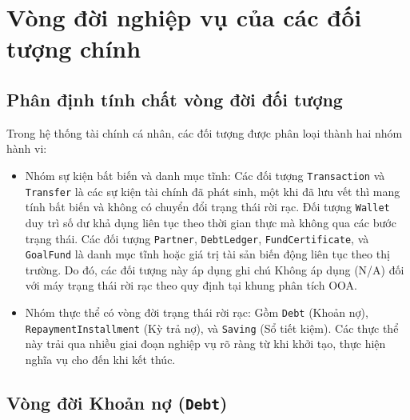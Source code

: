 \documentclass[11pt,a4paper]{article}
\newcommand{\code}[1]{\texttt{#1}}
\begin{document}
\section{Vòng đời nghiệp vụ của các đối tượng chính}

\subsection{Phân định tính chất vòng đời đối tượng}
Trong hệ thống tài chính cá nhân, các đối tượng được phân loại thành hai nhóm hành vi:
\begin{itemize}
  \item Nhóm sự kiện bất biến và danh mục tĩnh: Các đối tượng \code{Transaction} và \code{Transfer} là các sự kiện tài chính đã phát sinh, một khi đã lưu vết thì mang tính bất biến và không có chuyển đổi trạng thái rời rạc. Đối tượng \code{Wallet} duy trì số dư khả dụng liên tục theo thời gian thực mà không qua các bước trạng thái. Các đối tượng \code{Partner}, \code{DebtLedger}, \code{FundCertificate}, và \code{GoalFund} là danh mục tĩnh hoặc giá trị tài sản biến động liên tục theo thị trường. Do đó, các đối tượng này áp dụng ghi chú Không áp dụng (N/A) đối với máy trạng thái rời rạc theo quy định tại khung phân tích OOA.
  \item Nhóm thực thể có vòng đời trạng thái rời rạc: Gồm \code{Debt} (Khoản nợ), \code{RepaymentInstallment} (Kỳ trả nợ), và \code{Saving} (Sổ tiết kiệm). Các thực thể này trải qua nhiều giai đoạn nghiệp vụ rõ ràng từ khi khởi tạo, thực hiện nghĩa vụ cho đến khi kết thúc.
\end{itemize}

\subsection{Vòng đời Khoản nợ (\texttt{Debt})}
\end{document}
